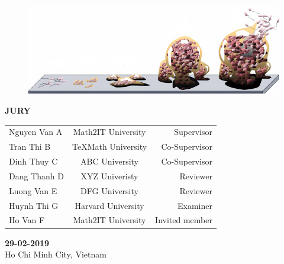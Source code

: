 \documentclass[12pt,a4paper]{article}
\begin{document}
\begin{titlepage}


\begin{center}
  \begin{figure}[h]
  \begin{center}
  \includegraphics[width=0.8\linewidth]{biofilm}
  \end{center}
  \end{figure}
\end{center}
%

\begin{center}
\normalsize\sffamily
\textbf{JURY}
\end{center}

\vspace{-0.2cm}

\begin{table}[hb!]
	\sffamily
	\centering
	\begin{tabular}{lcr}
		Nguyen Van A & Math2IT University & Supervisor \\
		Tran Thi B & \TeX Math University & Co-Supervisor \\
		Dinh Thuy C & ABC University & Co-Supervisor \\
		Dang Thanh D & XYZ Univeristy & Reviewer \\
		Luong Van E & DFG University & Reviewer \\
		Huynh Thi G & Harvard University & Examiner \\
		Ho Van F & Math2IT University & Invited member
	\end{tabular}
\end{table}

\begin{center}
\sffamily
\textbf{29-02-2019} \\
Ho Chi Minh City, Vietnam
\end{center}


\end{titlepage}
\end{document}
